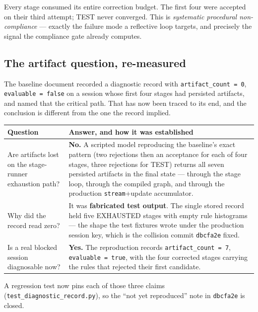 \documentclass[11pt,a4paper]{article}
\begin{document}
Every stage consumed its entire correction budget. The first four were accepted on
their third attempt; TEST never converged. This is \emph{systematic procedural
non-compliance} --- exactly the failure mode a reflective loop targets, and
precisely the signal the compliance gate already computes.

\subsection{The artifact question, re-measured}

The baseline document recorded a diagnostic record with
\texttt{artifact\_count = 0}, \texttt{evaluable = false} on a session whose first
four stages had persisted artifacts, and named that the critical path. That has now
been traced to its end, and the conclusion is different from the one the record
implied.

\begin{center}
\begin{tabular}{@{}p{}p{}@{}}
\toprule
\textbf{Question} & \textbf{Answer, and how it was established} \\
\midrule
Are artifacts lost on the stage-runner exhaustion path? & \textbf{No.} A scripted
model reproducing the baseline's exact pattern (two rejections then an acceptance
for each of four stages, three rejections for TEST) returns all seven persisted
artifacts in the final state --- through the stage loop, through the compiled graph,
and through the production \texttt{stream}+update accumulator. \\
Why did the record read zero? & It was \textbf{fabricated test output}. The single
stored record held five EXHAUSTED stages with empty rule histograms --- the shape
the test fixtures wrote under the production session key, which is the collision
commit \texttt{dbcfa2e} fixed. \\
Is a real blocked session diagnosable now? & \textbf{Yes.} The reproduction records
\texttt{artifact\_count = 7}, \texttt{evaluable = true}, with the four corrected
stages carrying the rules that rejected their first candidate. \\
\bottomrule
\end{tabular}
\end{center}

A regression test now pins each of those three claims
(\texttt{test\_diagnostic\_record.py}), so the ``not yet reproduced'' note in
\texttt{dbcfa2e} is closed.
\end{document}
